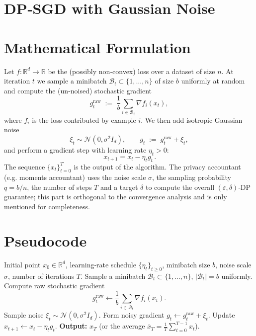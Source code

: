 \documentclass{article}
\newcommand{\R}{\mathbb{R}}
\begin{document}
\section*{DP‑SGD with Gaussian Noise}

\section*{Mathematical Formulation}
Let $f:\R^{d}\rightarrow\R$ be the (possibly non‑convex) loss over a dataset of size $n$.  
At iteration $t$ we sample a minibatch $\mathcal{B}_{t}\subset\{1,\dots ,n\}$ of size $b$ uniformly at random and compute the (un‑noised) stochastic gradient
\[
g^{\text{raw}}_{t}\;:=\;\frac{1}{b}\sum_{i\in\mathcal{B}_{t}}\nabla f_i(x_{t}),
\]
where $f_i$ is the loss contributed by example $i$.  
We then add isotropic Gaussian noise
\[
\xi_{t}\sim\mathcal{N}(0,\sigma^{2}I_{d}),
\qquad 
g_{t}\;:=\;g^{\text{raw}}_{t}+\xi_{t},
\]
and perform a gradient step with learning rate $\eta_{t}>0$:
\begin{equation}
\boxed{\,x_{t+1}=x_{t}-\eta_{t} g_{t}\,}.
\label{eq:update}
\end{equation}
The sequence $\{x_{t}\}_{t=0}^{T}$ is the output of the algorithm.  
The privacy accountant (e.g. moments accountant) uses the noise scale $\sigma$,
the sampling probability $q=b/n$, the number of steps $T$ and a target $\delta$ to compute the overall $(\varepsilon,\delta)$‑DP guarantee; this part is orthogonal to the convergence analysis and is only mentioned for completeness.

\section*{Pseudocode}
\begin{algorithm}[H]
\caption{DP‑SGD with Gaussian Noise}
\begin{algorithmic}[1]
\Require Initial point $x_{0}\in\R^{d}$, learning‑rate schedule $\{\eta_{t}\}_{t\ge0}$, minibatch size $b$, noise scale $\sigma$, number of iterations $T$.
    \State Sample a minibatch $\mathcal{B}_{t}\subset\{1,\dots ,n\}$, $|\mathcal{B}_{t}|=b$ uniformly.
    \State Compute raw stochastic gradient 
    \[
    g^{\text{raw}}_{t}\gets\frac{1}{b}\sum_{i\in\mathcal{B}_{t}}\nabla f_i(x_{t}) .
    \]
    \State Sample noise $\xi_{t}\sim\mathcal{N}(0,\sigma^{2}I_{d})$.
    \State Form noisy gradient $g_{t}\gets g^{\text{raw}}_{t}+\xi_{t}$.
    \State Update $x_{t+1}\gets x_{t}-\eta_{t} g_{t}$.
\EndFor
\State \textbf{Output:} $x_{T}$ (or the average $\bar x_{T}=\frac1T\sum_{t=0}^{T-1}x_{t}$).
\end{algorithmic}
\end{algorithm}
\end{document}

